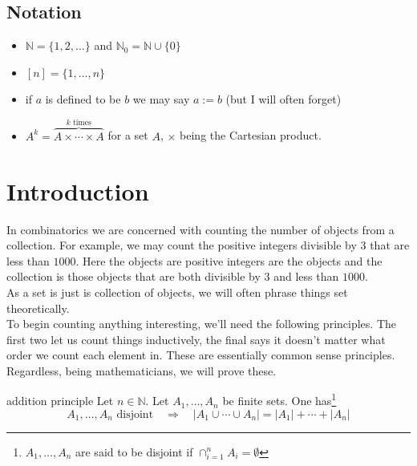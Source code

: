 \documentclass{article}
\newcounter{statementcount}
\begin{document}
\subsection*{Notation}

\begin{itemize}
    \item $\mathbb{N} = \{1, 2, \dots\}$ and $\mathbb{N}_0 = \mathbb{N} \cup \{0\}$
    \item $[n] = \{1, \dots, n\}$
    \item if $a$ is defined to be $b$ we may say $a := b$ (but I will often forget)
    \item $A^k = \overbrace{A \times \cdots \times A}^{k \text{ times}}$ for a set $A$, $\times$ being the Cartesian product. 
\end{itemize}

\newpage

\tableofcontents

\newpage

\section{Introduction}

\setcounter{statementcount}{1}

In combinatorics we are concerned with counting the number of objects from a collection. For example, we may count the positive integers divisible
by $3$ that are less than $1000$. Here the objects are positive integers are the objects and the collection is those objects that are both divisible 
by $3$ and less than $1000$. \\

As a set is just is collection of objects, we will often phrase things set theoretically. \\

To begin counting anything interesting, we'll need the following principles. The first two let us count things inductively, the final 
says it doesn't matter what order we count each element in. These are essentially common sense principles. Regardless, being mathematicians, 
we will prove these.

\begin{theorem}[]{addition principle}
    Let $n \in \mathbb{N}$. Let $A_1, \dots, A_n$ be finite sets. One has\footnote{$A_1, \dots, A_n$ are said to be disjoint if 
    $\cap_{i=1}^n A_i = \emptyset$}
    \[A_1, \dots, A_n \text{ disjoint} \quad \Longrightarrow \quad |A_1 \cup \cdots \cup A_n| = |A_1| + \cdots + |A_n|\]
\end{theorem}
\end{document}
